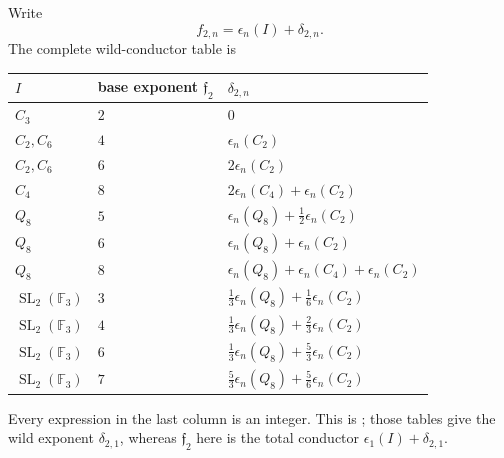 \documentclass[11pt,reqno]{amsart}
\theoremstyle{definition}
\theoremstyle{remark}
\newcommand{\SL}{\operatorname{SL}}
\begin{document}
Write
\begin{equation*}
 f_{2,n}=\epsilon_n(I)+\delta_{2,n}.
\end{equation*}
The complete wild-conductor table is
\begin{center}
\small
\renewcommand{\arraystretch}{1.2}
\begin{tabular}{@{}lll@{}}
\toprule
$I$ & base exponent $\mathfrak f_2$ & $\delta_{2,n}$ \\
\midrule
$C_3$ & $2$ & $0$ \\
$C_2,C_6$ & $4$ & $\epsilon_n(C_2)$ \\
$C_2,C_6$ & $6$ & $2\epsilon_n(C_2)$ \\
$C_4$ & $8$ & $2\epsilon_n(C_4)+\epsilon_n(C_2)$ \\
$Q_8$ & $5$ & $\epsilon_n(Q_8)+\tfrac12\epsilon_n(C_2)$ \\
$Q_8$ & $6$ & $\epsilon_n(Q_8)+\epsilon_n(C_2)$ \\
$Q_8$ & $8$ & $\epsilon_n(Q_8)+\epsilon_n(C_4)+\epsilon_n(C_2)$ \\
$\SL_2(\mathbb F_3)$ & $3$ &
$\tfrac13\epsilon_n(Q_8)+\tfrac16\epsilon_n(C_2)$ \\
$\SL_2(\mathbb F_3)$ & $4$ &
$\tfrac13\epsilon_n(Q_8)+\tfrac23\epsilon_n(C_2)$ \\
$\SL_2(\mathbb F_3)$ & $6$ &
$\tfrac13\epsilon_n(Q_8)+\tfrac53\epsilon_n(C_2)$ \\
$\SL_2(\mathbb F_3)$ & $7$ &
$\tfrac53\epsilon_n(Q_8)+\tfrac56\epsilon_n(C_2)$ \\
\bottomrule
\end{tabular}
\end{center}
Every expression in the last column is an integer.
This is \cite[Tables~2 and 3]{MartinWatkins}; those tables give the wild
exponent $\delta_{2,1}$, whereas $\mathfrak f_2$ here is the total conductor
$\epsilon_1(I)+\delta_{2,1}$.
\end{document}
